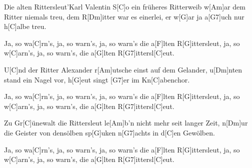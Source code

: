\documentclass[../main.tex]{subfiles}
\begin{document}
\begin{song}{Die alten Rittersleut'}{Karl Valentin}{}
S[C]o ein früheres Ritterweib w[Am]ar dem Ritter niemals treu,
dem R[Dm]itter war es einerlei, er w[G]ar ja a[G7]uch nur h[C]albe treu.

Ja, so wa[C]rn's, ja, so warn's, ja, so warn's die a[F]lten R[G]ittersleut, ja, so w[C]arn's, ja, so warn's, die a[G]lten R[G7]ittersl[C]eut.

U[C]nd der Ritter Alexander r[Am]utsche einst auf dem Gelander,
u[Dm]nten stand ein Nagel vor, h[G]eut singt [G7]er im Kn[C]abenchor.

Ja, so wa[C]rn's, ja, so warn's, ja, so warn's die a[F]lten R[G]ittersleut, ja, so w[C]arn's, ja, so warn's, die a[G]lten R[G7]ittersl[C]eut.

Zu Gr[C]{ü}newalt die Rittersleut le[Am]b'n nicht mehr seit langer Zeit,
n[Dm]ur die Geister von densölben sp[G]uken n[G7]achts in d[C]en Gewölben.

Ja, so wa[C]rn's, ja, so warn's, ja, so warn's die a[F]lten R[G]ittersleut, ja, so w[C]arn's, ja, so warn's, die a[G]lten R[G7]ittersl[C]eut.

\end{song}
\end{document}
